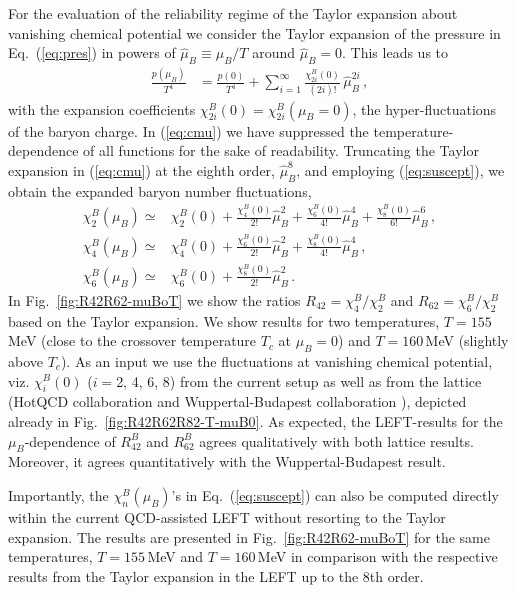 \documentclass[%
reprint,
superscriptaddress,
showpacs,preprintnumbers,
amsmath,amssymb,
aps,
prd,
]{revtex4-1}
\def\Fig#1{Fig.~\ref{#1}} \def\Tab#1{Tab.~\ref{#1}}
\def\Eq#1{Eq.~(\ref{#1})}
\def\eq#1{(\ref{#1})}
\begin{document}
For the evaluation of the reliability regime of the Taylor expansion about vanishing chemical potential we consider the Taylor expansion of the pressure in \Eq{eq:pres} in powers of $\hat{\mu}_{B}\equiv\mu_B/T$ around $\hat{\mu}_{B}=0$. This leads us to 
%
\begin{align}
\frac{p(\mu_B)}{T^4}&=\frac{p(0)}{T^4}+\sum_{i=1}^{\infty}\frac{\chi^B_{2i}(0)}{(2i)!}\,\hat{\mu}_{B}^{2i}\,,\label{eq:cmu}
\end{align}
%
with the expansion coefficients $\chi^B_{2i}(0)=\chi^B_{2i}(\mu_B=0)$, the hyper-fluctuations of the baryon charge. In \eq{eq:cmu} we have suppressed the temperature-dependence of all functions for the sake of readability. Truncating the Taylor expansion in \eq{eq:cmu} at the eighth order, $\hat{\mu}_{B}^{8}$, and employing \eq{eq:suscept}, we obtain the expanded baryon number fluctuations, 
%
\begin{align}
\chi^B_2(\mu_B)\simeq&\chi^B_2(0)+\frac{\chi^B_4(0)}{2!}\hat{\mu}_{B}^{2}+\frac{\chi^B_6(0)}{4!}\hat{\mu}_{B}^{4}+\frac{\chi^B_8(0)}{6!}\hat{\mu}_{B}^{6}\,,\nonumber \\[2ex]
\chi^B_4(\mu_B)\simeq&\chi^B_4(0)+\frac{\chi^B_6(0)}{2!}\hat{\mu}_{B}^{2}+\frac{\chi^B_8(0)}{4!}\hat{\mu}_{B}^{4}\,,\nonumber\\[2ex]
\chi^B_6(\mu_B)\simeq&\chi^B_6(0)+\frac{\chi^B_8(0)}{2!}\hat{\mu}_{B}^{2}\,.\label{eq:chiBTay}
\end{align}
%
In \Fig{fig:R42R62-muBoT} we show the ratios $R_{42}=\chi^B_4/\chi^B_2$ and $R_{62}=\chi^B_6/\chi^B_2$ based on the Taylor expansion. We show results for two temperatures,  $T=155$\,MeV (close to the crossover temperature $T_c$ at $\mu_B=0$) and $T=160$\,MeV (slightly above $T_c$). As an input we use the fluctuations at vanishing chemical potential, viz. $\chi^B_{i}(0)$ ($i=$2, 4, 6, 8) from the current setup as well as from the lattice (HotQCD collaboration \cite{Bazavov:2020bjn} and Wuppertal-Budapest collaboration \cite{Borsanyi:2018grb}), depicted already in \Fig{fig:R42R62R82-T-muB0}. As expected, the LEFT-results for the $\mu_B$-dependence of $R^{B}_{42}$ and $R^{B}_{62}$ agrees qualitatively with both lattice results. Moreover, it agrees quantitatively with the Wuppertal-Budapest result.   

Importantly, the $\chi^B_n(\mu_B)$'s in \Eq{eq:suscept} can  also be computed directly within the current QCD-assisted LEFT without resorting to the Taylor expansion. The results are presented in \Fig{fig:R42R62-muBoT} for the same temperatures, 
$T=155$\,MeV and $T=160$\,MeV in comparison with the respective results from the Taylor expansion in the LEFT up to the 8th order.  
\end{document}
